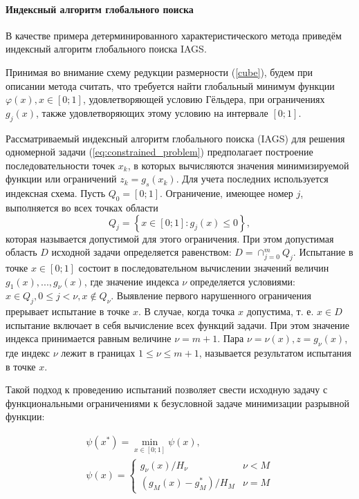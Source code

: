 \paragraph{Индексный алгоритм глобального поиска}
В качестве примера детерминированного характеристического метода приведём индексный алгоритм глобального поиска IAGS.

Принимая во внимание схему редукции размерности (\ref{cube}), будем при описании метода считать, что
требуется найти глобальный минимум функции \(\varphi(x), x\in[0;1]\),
удовлетворяющей условию Гёльдера, при ограничениях \(g_j(x)\), также
удовлетворяющих этому условию на интервале \([0;1]\).

Рассматриваемый индексный алгоритм глобального поиска (IAGS) для решения
одномерной задачи (\ref{eq:constrained_problem}) предполагает построение последовательности
точек \(x_k\), в которых вычисляются значения минимизируемой функции или ограничений \(z_k = g_s(x_k)\).
Для учета последних используется индексная схема. Пусть \(Q_0=[0;1]\). Ограничение, имеющее номер
 \(j\), выполняется во всех точках области
\begin{displaymath}
  Q_j=\left\{x\in [0;1]:g_j(x)\leq 0\right\},
\end{displaymath}
которая называется допустимой для этого ограничения. При этом допустимая область \(D\)
исходной задачи определяется равенством: \(D=\cap _{j=0}^{m}Q_{j}\).
Испытание в точке \(x\in [0;1]\) состоит в последовательном вычислении значений
величин \(g_{1}(x),...,g_{\nu }(x)\), где значение индекса \(\nu\) определяется условиями:
\(x\in Q_{j},0\leqslant j<\nu ,x\notin Q_{\nu }\). Выявление первого нарушенного ограничения
прерывает испытание в точке \(x\). В случае, когда точка \(x\)  допустима, т. е.
\(x\in D\) испытание включает в себя вычисление всех функций задачи. При этом значение
индекса принимается равным величине \(\nu =m+1\). Пара \(\nu =\nu (x),z=g_{\nu }(x)\),
где индекс \(\nu\) лежит в границах \(1\leqslant \nu \leqslant m+1\), называется результатом
испытания в точке \(x\).

Такой подход к проведению испытаний позволяет свести исходную задачу с функциональными
ограничениями к безусловной задаче минимизации разрывной функции:

\begin{displaymath}
  \begin{array}{lr}
    \psi (x^{*})=\min_{x\in [0;1]}\psi (x), \\
    \psi (x)={\begin{cases}g_{\nu }(x)/H_{\nu }&\nu <M\\(g_{M}(x)-g_{M}^{*})/H_{M}&\nu =M\end{cases}}
  \end{array}
\end{displaymath}

